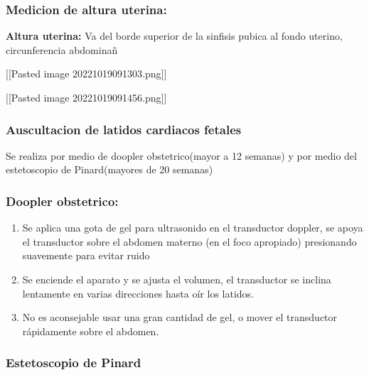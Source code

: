 \documentclass[
]{article}
\providecommand{\tightlist}{%
  \setlength{\itemsep}{0pt}\setlength{\parskip}{0pt}}
\begin{document}
\hypertarget{medicion-de-altura-uterina}{%
\subsubsection{Medicion de altura
uterina:}\label{medicion-de-altura-uterina}}

\textbf{Altura uterina:} Va del borde superior de la sinfisis pubica al
fondo uterino, circunferencia abdominañ

{[}{[}Pasted image 20221019091303.png{]}{]}

{[}{[}Pasted image 20221019091456.png{]}{]}

\hypertarget{auscultacion-de-latidos-cardiacos-fetales}{%
\subsubsection{Auscultacion de latidos cardiacos
fetales}\label{auscultacion-de-latidos-cardiacos-fetales}}

Se realiza por medio de doopler obstetrico(mayor a 12 semanas) y por
medio del estetoscopio de Pinard(mayores de 20 semanas)

\hypertarget{doopler-obstetrico}{%
\subsubsection{Doopler obstetrico:}\label{doopler-obstetrico}}

\begin{enumerate}
\def\labelenumi{\arabic{enumi}.}
\tightlist
\item
  Se aplica una gota de gel para ultrasonido en el transductor doppler,
  se apoya el transductor sobre el abdomen materno (en el foco
  apropiado) presionando suavemente para evitar ruido
\item
  Se enciende el aparato y se ajusta el volumen, el transductor se
  inclina lentamente en varias direcciones hasta oír los latidos.
\item
  No es aconsejable usar una gran cantidad de gel, o mover el
  transductor rápidamente sobre el abdomen.
\end{enumerate}

\hypertarget{estetoscopio-de-pinard}{%
\subsubsection{Estetoscopio de Pinard}\label{estetoscopio-de-pinard}}
\end{document}
